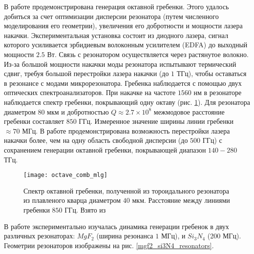 В работе \cite{DelHaye2011} продемонстрирована генерация октавной гребенки. Этого удалось добиться за счет оптимизации дисперсии резонатора (путем численного моделирования его геометрии), увеличения его добротности и мощности лазера накачки. Экспериментальная установка состоит из диодного лазера, сигнал которого усиливается эрбидиевым волоконным усилителем (EDFA) до выходный мощности $2.5$ Вт. Связь с резонатором осуществляется через растянутое волокно. Из-за большой мощности накачки моды резонатора испытывают термический сдвиг, требуя большой перестройки лазера накачки (до $1$ ТГц), чтобы оставаться в резонансе с модами микрорезонатора. Гребенка наблюдается с помощью двух оптических спектроанализаторов. При накачке на частоте $1560$ нм в резонаторе наблюдается спектр гребенки, покрывающий одну октаву (рис. \ref{octave_comb_mlg}). Для резонатора диаметром $80$ мкм и добротностью $Q\approx2.7\times10^8$ межмодовое расстояние гребенки составляет $850$ ГГц. Измеренное значение ширины линии гребенки $\approx 70$ МГц. В работе продемонстрирована возможность перестройки лазера накачки более, чем на одну область свободной дисперсии (до $500$ ГГц) с сохранением генерации октавной гребенки, покрывающей диапазон $140-280$ ТГц.
\begin{figure}
  \texttt{[image: octave\_comb\_mlg]}
  \caption{Спектр октавной гребенки, полученной из тороидального резонатора из плавленого кварца диаметром $40$ мкм. Расстояние между линиями гребенки $850$ ГГц. Взято из \cite{DelHaye2011}}
  \label{octave_comb_mlg}
\end{figure}


В работе \cite{Herr2012} экспериментально изучалась динамика генерации гребенок в двух различных резонаторах: $MgF_2$ (ширина резонанса $1$ МГц), и $Si_3N_4$ (200 МГц). Геометрии резонаторов изображены на рис. \ref{mgf2_si3N4_resonators}.

